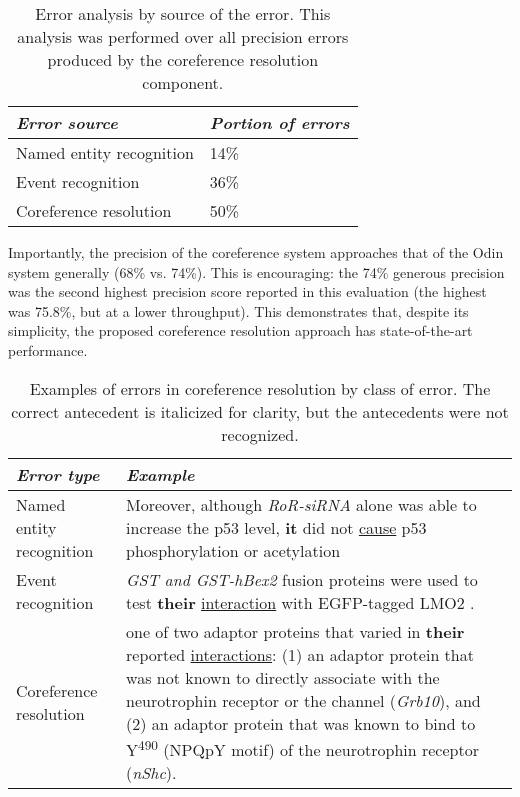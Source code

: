 \begin{table}
\centering
\begin{tabular}{l l}
\toprule
{\it Error source}	& {\it Portion of errors}	\\
\midrule
Named entity recognition	& 14\%	\\
Event recognition	& 36\%	\\
Coreference resolution	& 50\%	\\
\bottomrule
\end{tabular}
\caption{Error analysis by source of the error. This analysis was performed over all precision errors produced by the coreference resolution component.}
\label{tab:errors}
\end{table}

Importantly, the precision of the coreference system approaches that of the Odin system generally (68\% vs. 74\%). This is encouraging: the 74\% generous precision was the second highest precision score reported in this evaluation (the highest was 75.8\%, but at a lower throughput). This demonstrates that, despite its simplicity, the proposed coreference resolution approach has state-of-the-art performance.

\begin{table}
\centering
\begin{tabular}{ @{} p{} p{} @{}}
\toprule
{\it Error type}	& {\it Example}	\\
\midrule
Named entity recognition	& Moreover, although {\it RoR-siRNA} alone was able to increase the p53 level, {\bf it} did not \underline{cause} p53 phosphorylation or acetylation\textellipsis	\\
Event recognition	& {\it GST and GST-hBex2} fusion proteins were used to test {\bf their} \underline{interaction} with EGFP-tagged LMO2	.\\
Coreference resolution	& \textellipsis one of two adaptor proteins that varied in {\bf their} reported \underline{interactions}: (1) an adaptor protein that was not known to directly associate with the neurotrophin receptor or the channel ({\it Grb10}), and (2) an adaptor protein that was known to bind to Y\textsuperscript{490} (NPQpY motif) of the neurotrophin receptor ({\it nShc}).	\\
\bottomrule
\end{tabular}
\caption{Examples of errors in coreference resolution by class of error. The correct antecedent is italicized for clarity, but the antecedents were not recognized.}\label{tab:error-examples}
\end{table}

